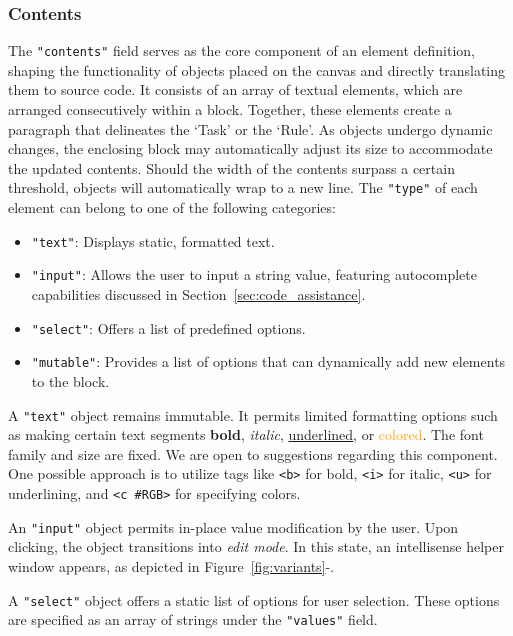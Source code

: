 \subsubsection{Contents}
\label{sec:contents}

The \texttt{"contents"} field serves as the core component of an element definition, shaping the functionality of objects placed on the canvas and directly translating them to source code. It consists of an array of textual elements, which are arranged consecutively within a block. Together, these elements create a paragraph that delineates the `Task' or the `Rule'. As objects undergo dynamic changes, the enclosing block may automatically adjust its size to accommodate the updated contents. Should the width of the contents surpass a certain threshold, objects will automatically wrap to a new line. The \texttt{"type"} of each element can belong to one of the following categories:

\begin{itemize}
  \item \texttt{"text"}: Displays static, formatted text.
  \item \texttt{"input"}: Allows the user to input a string value, featuring autocomplete capabilities discussed in Section~\ref{sec:code_assistance}.
  \item \texttt{"select"}: Offers a list of predefined options.
  \item \texttt{"mutable"}: Provides a list of options that can dynamically add new elements to the block.
\end{itemize}

A \texttt{"text"} object remains immutable. It permits limited formatting options such as making certain text segments \textbf{bold}, \textit{italic}, \underline{underlined}, or \textcolor{orange}{colored}. The font family and size are fixed. We are open to suggestions regarding this component. One possible approach is to utilize tags like \texttt{<b>} for bold, \texttt{<i>} for italic, \texttt{<u>} for underlining, and \texttt{<c \#RGB>} for specifying colors.

An \texttt{"input"} object permits in-place value modification by the user. Upon clicking, the object transitions into \textit{edit mode}. In this state, an intellisense helper window appears, as depicted in Figure~\ref{fig:variants}-.

A \texttt{"select"} object offers a static list of options for user selection. These options are specified as an array of strings under the \texttt{"values"} field.

